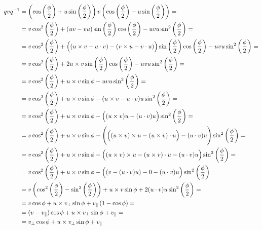 \begin{align*}
    q v q^{-1}
    & = \left ( \cos\left ( \frac{\phi}{2} \right ) + u \sin\left ( \frac{\phi}{2} \right ) \right ) v \left ( \cos\left ( \frac{\phi}{2} \right ) - u \sin\left ( \frac{\phi}{2} \right ) \right ) = \\
    & = v \cos^2 \left ( \frac{\phi}{2} \right ) + (uv - vu) \sin\left ( \frac{\phi}{2} \right ) \cos\left ( \frac{\phi}{2} \right ) - uvu \sin^2 \left ( \frac{\phi}{2} \right ) = \\
    & = v \cos^2 \left ( \frac{\phi}{2} \right ) + \Bigl( (u \times v - u \cdot v) - (v \times u - v \cdot u) \Bigr) \sin\left ( \frac{\phi}{2} \right ) \cos\left ( \frac{\phi}{2} \right ) - uvu \sin^2 \left ( \frac{\phi}{2} \right ) = \\
    & = v \cos^2 \left ( \frac{\phi}{2} \right ) + 2 u \times v \sin\left ( \frac{\phi}{2} \right ) \cos\left ( \frac{\phi}{2} \right ) - uvu \sin^2 \left ( \frac{\phi}{2} \right ) = \\
    & = v \cos^2 \left ( \frac{\phi}{2} \right ) + u \times v \sin\phi - uvu \sin^2 \left ( \frac{\phi}{2} \right ) = \\
    & = v \cos^2 \left ( \frac{\phi}{2} \right ) + u \times v \sin\phi - (u \times v - u \cdot v) u \sin^2 \left ( \frac{\phi}{2} \right ) = \\
    & = v \cos^2 \left ( \frac{\phi}{2} \right ) + u \times v \sin\phi - \Bigl( (u \times v) u - (u \cdot v) u \Bigr) \sin^2 \left ( \frac{\phi}{2} \right ) = \\
    & = v \cos^2 \left ( \frac{\phi}{2} \right ) + u \times v \sin\phi - \Biggl( \Bigl( (u \times v) \times u - (u \times v) \cdot u \Bigr) - (u \cdot v) u \Biggr) \sin^2 \left ( \frac{\phi}{2} \right ) = \\
    & = v \cos^2 \left ( \frac{\phi}{2} \right ) + u \times v \sin\phi - \Bigl( (u \times v) \times u - (u \times v) \cdot u - (u \cdot v) u \Bigr) \sin^2 \left ( \frac{\phi}{2} \right ) = \\
    & = v \cos^2 \left ( \frac{\phi}{2} \right ) + u \times v \sin\phi - \Bigl( (v - (u \cdot v) u) - 0 - (u \cdot v) u \Bigr) \sin^2 \left ( \frac{\phi}{2} \right ) = \\
    & = v \left ( \cos^2 \left ( \frac{\phi}{2} \right ) - \sin^2 \left ( \frac{\phi}{2} \right ) \right ) + u \times v \sin\phi + 2 (u \cdot v) u \sin^2 \left ( \frac{\phi}{2} \right ) = \\
    & = v \cos \phi + u \times v_{\perp} \sin\phi + v_{\parallel} \left ( 1 - \cos \phi \right ) = \\
    & = (v - v_{\parallel}) \cos \phi + u \times v_{\perp} \sin\phi + v_{\parallel} = \\
    & = v_{\perp} \cos \phi + u \times v_{\perp} \sin\phi + v_{\parallel} \\
\end{align*}
